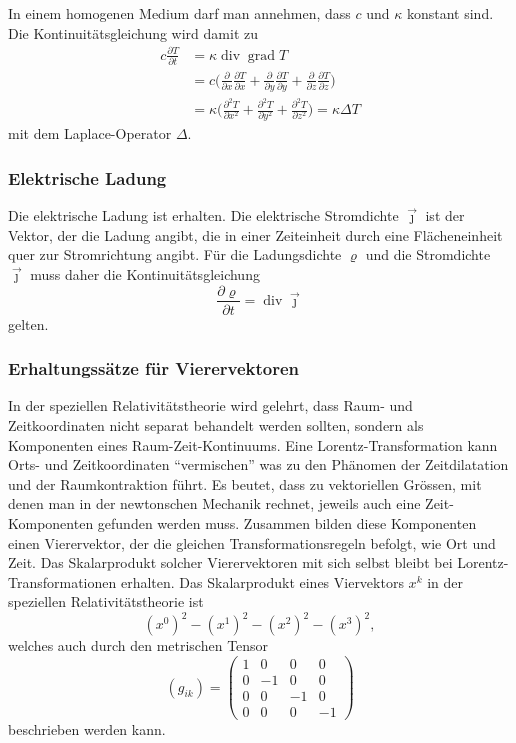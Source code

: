 In einem homogenen Medium darf man annehmen, dass $c$ und $\kappa$ konstant
sind.
Die Kontinuitätsgleichung wird damit zu
\begin{align*}
c\frac{\partial T}{\partial t}
&=
\kappa
\operatorname{div}\operatorname{grad}T
\\
&=
c
\biggl(
\frac{\partial}{\partial x}
\frac{\partial T}{\partial x}
+
\frac{\partial}{\partial y}
\frac{\partial T}{\partial y}
+
\frac{\partial}{\partial z}
\frac{\partial T}{\partial z}
\biggr)
\\
&=
\kappa
\biggl(
\frac{\partial^2 T}{\partial x^2}
+
\frac{\partial^2 T}{\partial y^2}
+
\frac{\partial^2 T}{\partial z^2}
\biggr)
=
\kappa \Delta T
\end{align*}
mit dem Laplace-Operator $\Delta$.

%
%
\subsubsection{Elektrische Ladung}
Die elektrische Ladung ist erhalten.
Die elektrische Stromdichte $\vec{\jmath}$ ist der Vektor, der die Ladung
angibt, die in einer Zeiteinheit durch eine Flächeneinheit quer zur
Stromrichtung angibt.
Für die Ladungsdichte $\varrho$ und die Stromdichte $\vec{\jmath}$
muss daher die Kontinuitätsgleichung
\[
\frac{\partial\varrho}{\partial t}
=
\operatorname{div} \vec{\jmath}
\]
gelten.

%
%
\subsubsection{Erhaltungssätze für Vierervektoren}
In der speziellen Relativitätstheorie wird gelehrt, dass Raum- und
Zeitkoordinaten nicht separat behandelt werden sollten, sondern als
Komponenten eines Raum-Zeit-Kontinuums.
Eine Lorentz-Transformation kann Orts- und Zeitkoordinaten  ``vermischen''
was zu den Phänomen der Zeitdilatation und der Raumkontraktion führt.
Es beutet, dass zu vektoriellen Grössen, mit denen man in der newtonschen
Mechanik rechnet, jeweils auch eine Zeit-Komponenten gefunden werden
muss.
Zusammen bilden diese Komponenten einen Vierervektor, der die gleichen
Transformationsregeln befolgt, wie Ort und Zeit.
Das Skalarprodukt solcher Vierervektoren mit sich selbst bleibt
bei Lorentz-Transformationen erhalten.
Das Skalarprodukt eines Viervektors $x^k$ in der speziellen
Relativitätstheorie ist
\[
(x^0)^2
-
(x^1)^2
-
(x^2)^2
-
(x^3)^2,
\]
welches auch durch den metrischen Tensor
\[
(g_{ik})
=
\begin{pmatrix}
1&0&0&0\\
0&-1&0&0\\
0&0&-1&0\\
0&0&0&-1
\end{pmatrix}
\]
beschrieben werden kann.

